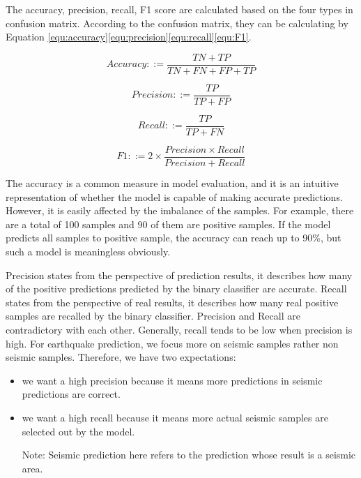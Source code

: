 \documentclass[final-report]{report-template}
\begin{document}
The accuracy, precision, recall, F1 score are calculated based on the four types in confusion matrix.
According to the confusion matrix, they can be calculating by Equation \eqref{equ:accuracy}\eqref{equ:precision}\eqref{equ:recall}\eqref{equ:F1}.

\begin{equation}
    Accuracy ::= \frac{TN + TP}{TN+FN+FP+TP}  \label{equ:accuracy}    
\end{equation}

\begin{equation}
    Precision ::= \frac{TP}{TP+FP}  \label{equ:precision}    
\end{equation}

\begin{equation}
    Recall ::= \frac{TP}{TP+FN}  \label{equ:recall}    
\end{equation}

\begin{equation}
    F1 ::= 2 \times \frac{Precision \times Recall}{Precision+Recall}  \label{equ:F1}    
\end{equation}

The accuracy is a common measure in model evaluation, and it is an intuitive representation of whether the model is capable of making accurate predictions.
However, it is easily affected by the imbalance of the samples. For example, there are a total of 100 samples and 90 of them are positive samples.
If the model predicts all samples to positive sample, the accuracy can reach up to 90\%, but such a model is meaningless obviously.  

Precision states from the perspective of prediction results, it describes how many of the positive predictions predicted by the binary classifier are accurate. 
Recall states from the perspective of real results, it describes how many real positive samples are recalled by the binary classifier.
Precision and Recall are contradictory with each other. Generally, recall tends to be low when precision is high.
For earthquake prediction, we focus more on seismic samples rather non seismic samples. 
Therefore, we have two expectations:
\begin{itemize}
    \item we want a high precision because it means more predictions in seismic predictions are correct.  
    \item we want a high recall because it means more actual seismic samples are selected out by the model.
    
    Note: Seismic prediction here refers to the prediction whose result is a seismic area.
\end{itemize}
\end{document}
